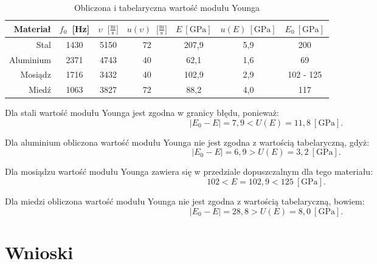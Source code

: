 \documentclass[12pt,a4paper]{article}
\numberwithin{equation}{section}
\begin{document}
\begin{table}[!ht]
	\caption{Obliczona i tabelaryczna wartość modułu Younga}
	\centering
	\begin{adjustbox}{width=1\textwidth}
	\begin{center}
		\begin{tabular}{r|c|c|c|c|c|c}
			\hline  \rule{0pt}{18pt} 
			Materiał & $f_0$~[Hz] & $\upsilon$~$\Big[\frac{\textrm{m}}{\textrm{s}}\Big]$ & $u(\upsilon)$~$\Big[\frac{\textrm{m}}{\textrm{s}}\Big]$ & $E~[\textrm{GPa}]$ & $u(E)~[\textrm{GPa}]$ & $E_0~[\textrm{GPa}]$\\ \hline \hline
			Stal & 1430 & 5150 & 72 & 207,9 & 5,9 & 200 \\
			Aluminium & 2371 & 4743 & 40 & 62,1 & 1,6 & 69  \\
			Mosiądz & 1716 & 3432 & 40 & 102,9 & 2,9 & 102 - 125  \\
			Miedź & 1063 & 3827 & 72 & 88,2 & 4,0 & 117  \\ \hline
		\end{tabular}
	\end{center}
	\end{adjustbox}
	\label{tab:tab3}
\end{table}

Dla stali wartość modułu Younga jest zgodna w granicy błędu, ponieważ:
\begin{equation}
	\Big|E_0 - E\Big| = 7,9 < U(E) = 11,8~[\textrm{GPa}].
\end{equation}

Dla aluminium obliczona wartość modułu Younga nie jest zgodna z wartością tabelaryczną, gdyż:
\begin{equation}
\Big|E_0 - E\Big| = 6,9 > U(E) = 3,2~[\textrm{GPa}].
\end{equation}

Dla mosiądzu wartość modułu Younga zawiera się w przedziale dopuszczalnym dla tego materiału:
\begin{equation}
	102 < E = 102,9 < 125~[\textrm{GPa}].
\end{equation}

Dla miedzi obliczona wartość modułu Younga nie jest zgodna z wartością tabelaryczną, bowiem:
\begin{equation}
\Big|E_0 - E\Big| = 28,8 > U(E) = 8,0~[\textrm{GPa}].
\end{equation}

\pagebreak
\section{Wnioski}
\end{document}
